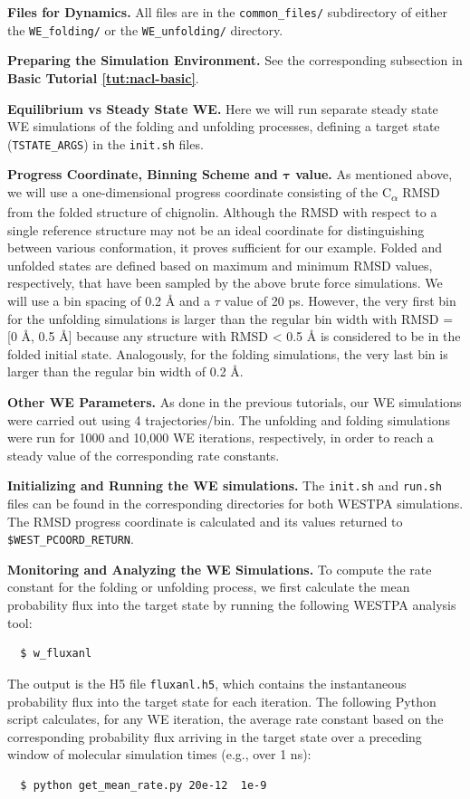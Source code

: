 \textbf{Files for Dynamics.} All files are in the \verb|common_files/| subdirectory of either the \verb|WE_folding/| or the \verb|WE_unfolding/| directory.
 
\textbf{Preparing the Simulation Environment.} See the corresponding subsection in \textbf{Basic Tutorial \ref{tut:nacl-basic}}.
 
\textbf{Equilibrium vs Steady State WE.} Here we will run separate steady state WE simulations of the folding and unfolding processes, defining a target state (\verb|TSTATE_ARGS|) in the \verb|init.sh| files.

\textbf{Progress Coordinate, Binning Scheme and $\pmb{\tau}$ value.} As mentioned above, we will use a one-dimensional progress coordinate consisting of the C\textsubscript{$\alpha$} RMSD from the folded structure of chignolin. 
Although the RMSD with respect to a single reference structure may not be an ideal coordinate for distinguishing between  various conformation, it proves sufficient for our example. 
Folded and unfolded states are defined based on maximum and minimum RMSD values, respectively, that have been sampled by the above brute force simulations. 
We will use a bin spacing  of 0.2 \AA{} and a $\tau$ value of 20 ps. 
However, the very first bin for the unfolding simulations is larger than the regular bin width with RMSD = [0 \AA, 0.5 \AA] because any structure with RMSD < 0.5 \AA{} is considered to be in the folded initial state. 
Analogously, for the folding simulations, the very last bin is larger than the regular bin width of 0.2 \AA. 
\pagebreak  

\textbf{Other WE Parameters.} As done in the previous tutorials, our WE simulations were carried out using 4 trajectories/bin. 
The unfolding and folding simulations were run for 1000 and 10,000 WE iterations, respectively, in order to reach a steady value of the corresponding rate constants. 
 
\textbf{Initializing and Running the WE simulations.} The \verb|init.sh| and \verb|run.sh| files can be found in the corresponding directories for both WESTPA simulations. 
The RMSD progress coordinate is calculated and its values returned to \verb|$WEST_PCOORD_RETURN|.   

\textbf{Monitoring and Analyzing the WE Simulations.} To compute the rate constant for the folding or unfolding process, we first calculate the mean probability flux into the target state by running the following WESTPA analysis tool:
\begin{verbatim}
  $ w_fluxanl
\end{verbatim}
The output is the H5 file \verb|fluxanl.h5|, which contains the instantaneous probability flux into the target state for each iteration. 
The following Python script calculates, for any WE iteration, the average rate constant based on the corresponding probability flux arriving in the target state over a preceding window of molecular simulation times (e.g., over 1 ns):
\begin{verbatim}
  $ python get_mean_rate.py 20e-12  1e-9
\end{verbatim}

